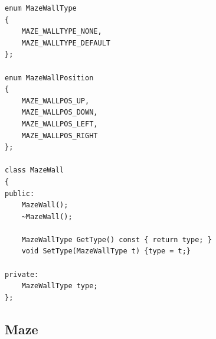 \lstCpp
\begin{lstlisting}[caption= The \texttt{MazeWall} class]
enum MazeWallType
{
    MAZE_WALLTYPE_NONE,
    MAZE_WALLTYPE_DEFAULT
};

enum MazeWallPosition
{
    MAZE_WALLPOS_UP,
    MAZE_WALLPOS_DOWN,
    MAZE_WALLPOS_LEFT,
    MAZE_WALLPOS_RIGHT
};

class MazeWall
{
public:
    MazeWall();
    ~MazeWall();
    
    MazeWallType GetType() const { return type; }
    void SetType(MazeWallType t) {type = t;}
    
private:
    MazeWallType type;
};
\end{lstlisting}

\subsection {Maze}
\lstCpp
